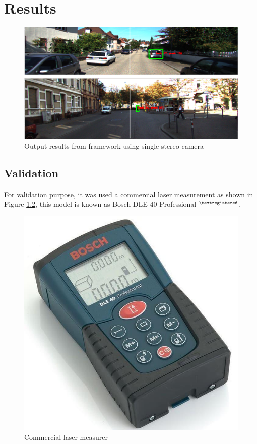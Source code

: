 \chapter{Results}
\label{capitulo5}




\begin{figure}[H]
\centering
\includegraphics[width=\textwidth]{imagens/ouput.png}
\caption{Output results from framework using single stereo camera}
\label{fig:output}
\end{figure}


\section{Validation}

For validation purpose, it was used a commercial laser measurement as shown in Figure \ref{fig:laser_meas}, this model is known as Bosch DLE 40 Professional $^{\tiny{\textregistered}}$. 



\begin{figure}[H]
\centering
\includegraphics[scale=0.3]{imagens/trena.jpg}
\caption{Commercial laser measurer}
\label{fig:laser_meas}
\end{figure}

